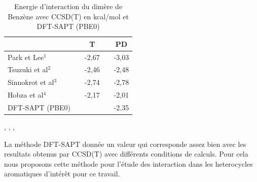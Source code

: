  \begin{table}[H]
 	\caption{Energie d'interaction du dimère de Benzène avec CCSD(T) en kcal/mol et DFT-SAPT (PBE0)}
 \begin{center}
 	 \begin{tabular}{l c c c c}
 	 	\toprule
 	& & T& & PD\\
 	\midrule
 	Park et Lee$^{1}$ & & -2,67& &-3,03\\
 	Tsuzuki et al$^{2}$ & & -2,46& & -2,48\\
 	Sinnokrot et al$^{3}$ & & -2,74& & -2,78\\
 	Hobza et al$^{4}$ & & -2,17& & -2,01\\
 	DFT-SAPT (PBE0) & & & & -2.35\\
 	\bottomrule
 \end{tabular}
\end{center}
\centering
{},
,
,
\label{benzene}
\end{table}

La méthode DFT-SAPT donnée un valeur qui corresponde assez bien avec les resultats obtenus par CCSD(T) avec différents conditions de calculs. Pour cela nous proposons cette méthode pour l'étude des interaction dans les heterocycles aromatiques d'intérêt pour ce travail.  
     
 